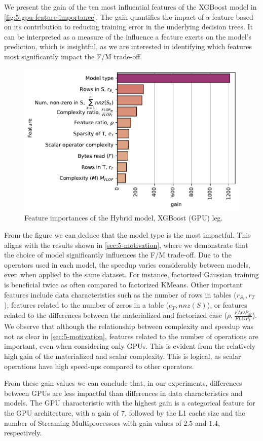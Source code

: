 We present the gain of the ten most influential features of the XGBoost model in \autoref{fig:5-gpu-feature-importance}. The gain quantifies the impact of a feature based on its contribution to reducing training error in the underlying decision trees. It can be interpreted as a measure of the influence a feature exerts on the model's prediction, which is insightful, as we are interested in identifying which features most significantly impact the F/M trade-off.
\begin{figure}[ht]
  \centering
  \includegraphics[width=0.75\linewidth]{chapters/05_cost_estimation/figures/xgboost-feat-importance.pdf}
  \caption[Feature importances of the hybrid model]{Feature importances of the Hybrid model, XGBoost (GPU) leg.}
  \label{fig:5-gpu-feature-importance}
\end{figure}

From the figure we can deduce that the model type is the most impactful. This aligns with the results shown in \autoref{sec:5-motivation}, where we demonstrate that the choice of model significantly influences the F/M trade-off. Due to the operators used in each model, the speedup varies considerably between models, even when applied to the same dataset. For instance, factorized Gaussian training is beneficial twice as often compared to factorized KMeans. Other important features include data characteristics such as the number of rows in tables ($r_{S_1}, r_T$), features related to the number of zeros in a table ($e_T, nnz(S)$), or features related to the differences between the materialized and factorized case ($\rho, \frac{FLOP_M}{FLOP_F}$). We observe that although the relationship between complexity and speedup was not as clear in \autoref{sec:5-motivation}, features related to the number of operations are important, even when considering only GPUs. This is evident from the relatively high gain of the materialized and scalar complexity. This is logical, as scalar operations have high speed-ups compared to other operators.

From these gain values we can conclude that, in our experiments, differences between GPUs are less impactful than differences in data characteristics and models. The GPU characteristic with the highest gain is a categorical feature for the GPU architecture, with a gain of $7$, followed by the L1 cache size and the number of Streaming Multiprocessors with gain values of $2.5$ and $1.4$, respectively.


